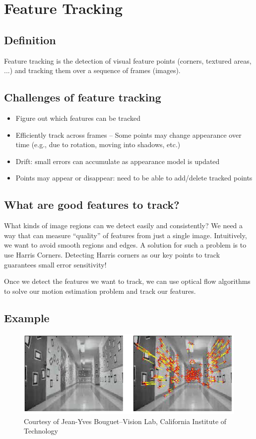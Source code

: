 \documentclass{article}
\begin{document}
\section{Feature Tracking}
\label{gen_inst}

\subsection{Definition}

Feature tracking is the detection of visual feature points (corners, textured areas, ...) and tracking them over a sequence of frames (images).


\subsection{Challenges of feature tracking}

\begin{itemize}
\item Figure out which features can be tracked
\item Efficiently track across frames – Some points may change appearance over time (e.g., due to rotation, moving into shadows, etc.)
\item Drift: small errors can accumulate as appearance model is updated
\item Points may appear or disappear: need to be able to add/delete tracked points
\end{itemize}

\subsection{What are good features to track?}
What kinds of image	regions	can	we detect easily and consistently? 
We need a way that can measure “quality” of	features from just a single	image. Intuitively,	we	want	to	avoid	smooth	regions	and	edges.
A solution for such a problem is to use Harris Corners. Detecting Harris corners as our key points to track guarantees small error sensitivity!

Once we detect the features we want to track, we can use optical flow algorithms to solve our motion estimation problem and track our features.

\subsection{Example}

\begin{figure}[h]
  \centering
  \includegraphics[width=\linewidth]{feature_track_example.PNG}
  \caption{Courtesy of Jean-Yves Bouguet–Vision Lab, California Institute of Technology}
\end{figure}
\end{document}
